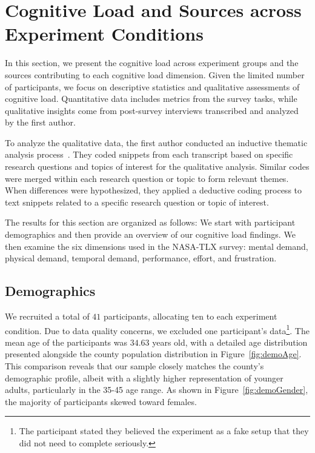 \section{Cognitive Load and Sources across Experiment Conditions}
\label{sec:cog_result}
In this section, we present the cognitive load across experiment groups and the sources contributing to each cognitive load dimension. Given the limited number of participants, we focus on descriptive statistics and qualitative assessments of cognitive load. Quantitative data includes metrics from the survey tasks, while qualitative insights come from post-survey interviews transcribed and analyzed by the first author.

To analyze the qualitative data, the first author conducted an inductive thematic analysis process~\cite{olsonWaysKnowingHCI2014}. They coded snippets from each transcript based on specific research questions and topics of interest for the qualitative analysis. Similar codes were merged within each research question or topic to form relevant themes. When differences were hypothesized, they applied a deductive coding process to text snippets related to a specific research question or topic of interest.

The results for this section are organized as follows: We start with participant demographics and then provide an overview of our cognitive load findings. We then examine the six dimensions used in the NASA-TLX survey: mental demand, physical demand, temporal demand, performance, effort, and frustration.

\subsection{Demographics}
We recruited a total of $41$ participants, allocating ten to each experiment condition. Due to data quality concerns, we excluded one participant's data\footnote{The participant stated they believed the experiment as a fake setup that they did not need to complete seriously.}. The mean age of the participants was $34.63$ years old, with a detailed age distribution presented alongside the county population distribution in Figure~\ref{fig:demoAge}. This comparison reveals that our sample closely matches the county's demographic profile, albeit with a slightly higher representation of younger adults, particularly in the 35-45 age range. As shown in Figure~\ref{fig:demoGender}, the majority of participants skewed toward females.

